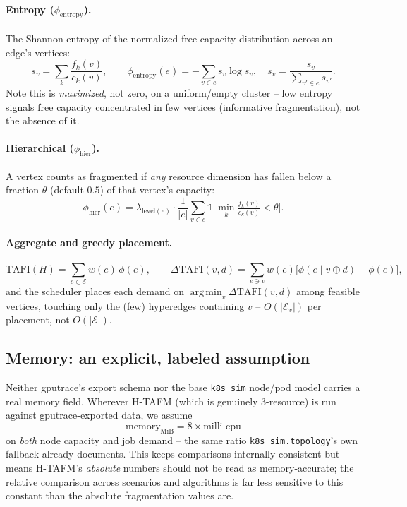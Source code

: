 \documentclass[11pt]{article}
\newcommand{\E}{\mathcal{E}}
\DeclareMathOperator*{\argmin}{arg\,min}
\begin{document}
\paragraph{Entropy ($\phi_{\text{entropy}}$).} The Shannon entropy of the
normalized free-capacity distribution across an edge's vertices:
\[
  s_v = \sum_{k} \frac{f_k(v)}{c_k(v)}, \qquad
  \phi_{\text{entropy}}(e) = -\sum_{v \in e} \bar s_v \log \bar s_v, \quad \bar s_v = \frac{s_v}{\sum_{v' \in e} s_{v'}}.
\]
Note this is \emph{maximized}, not zero, on a uniform/empty cluster --
low entropy signals free capacity concentrated in few vertices
(informative fragmentation), not the absence of it.

\paragraph{Hierarchical ($\phi_{\text{hier}}$).} A vertex counts as
fragmented if \emph{any} resource dimension has fallen below a fraction
$\theta$ (default $0.5$) of that vertex's capacity:
\[
  \phi_{\text{hier}}(e) = \lambda_{\text{level}(e)} \cdot
  \frac{1}{|e|}\sum_{v \in e} \mathbb{1}\Big[\min_k \tfrac{f_k(v)}{c_k(v)} < \theta\Big].
\]

\paragraph{Aggregate and greedy placement.}
\[
  \mathrm{TAFI}(H) = \sum_{e \in \E} w(e)\,\phi(e), \qquad
  \Delta\mathrm{TAFI}(v, d) = \sum_{e \ni v} w(e)\big[\phi(e \mid v \oplus d) - \phi(e)\big],
\]
and the scheduler places each demand on $\argmin_v \Delta\mathrm{TAFI}(v,d)$
among feasible vertices, touching only the (few) hyperedges containing
$v$ -- $O(|\E_v|)$ per placement, not $O(|\E|)$.

\subsection{Memory: an explicit, labeled assumption}
\label{sec:mem-assumption}
Neither gputrace's export schema nor the base \texttt{k8s\_sim} node/pod
model carries a real memory field. Wherever H-TAFM (which is genuinely
3-resource) is run against gputrace-exported data, we assume
\[
  \text{memory}_{\text{MiB}} = 8 \times \text{milli-cpu}
\]
on \emph{both} node capacity and job demand -- the same ratio
\texttt{k8s\_sim.topology}'s own fallback already documents. This keeps
comparisons internally consistent but means H-TAFM's \emph{absolute}
numbers should not be read as memory-accurate; the relative comparison
across scenarios and algorithms is far less sensitive to this constant
than the absolute fragmentation values are.
\end{document}
